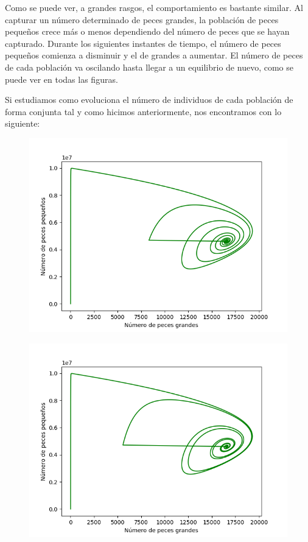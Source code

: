 \documentclass[11pt,a4paper]{report}
\begin{document}
Como se puede ver, a grandes rasgos, el comportamiento es bastante similar. Al capturar un número determinado de peces
grandes, la población de peces pequeños crece más o menos dependiendo del número de peces que se hayan capturado. Durante
los siguientes instantes de tiempo, el número de peces pequeños comienza a disminuir y el de grandes a aumentar. El número
de peces de cada población va oscilando hasta llegar a un equilibrio de nuevo, como se puede ver en todas las figuras.

Si estudiamos como evoluciona el número de individuos de cada población de forma conjunta tal y como hicimos anteriormente,
nos encontramos con lo siguiente:

\begin{figure}[H]
\centering
\begin{minipage}{.5\textwidth}
  \centering
  \includegraphics[scale=0.4]{img/peces-pg-mitad.png}
  \label{fig:peces-pg-mitad}
\end{minipage}%
\begin{minipage}{.5\textwidth}
  \centering
  \includegraphics[scale=0.4]{img/peces-pg-tercio.png}

\end{minipage}
\end{figure}
\end{document}
